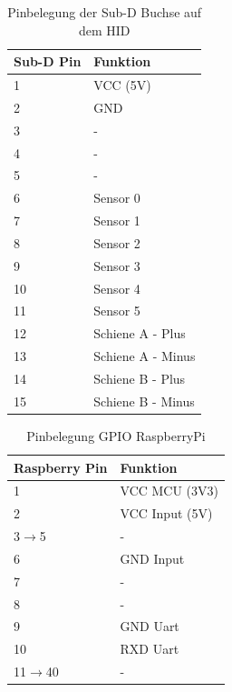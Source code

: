 \documentclass[a4paper, 11pt]{report}
\begin{document}
\begin{table}
		\begin{tabular}{|l|l|}
			\hline
			\textbf{Sub-D Pin} &\textbf{Funktion}\\
			\hline
			\hline
			1 & VCC (5V)\\
			\hline
			2 & GND\\
			\hline
			3 & -\\
			\hline
			4 & -\\
			\hline
			5 & -\\
			\hline
			6 & Sensor 0\\
			\hline
			7 & Sensor 1\\
			\hline
			8 & Sensor 2\\
			\hline
			9 & Sensor 3\\
			\hline
			10 & Sensor 4\\
			\hline
			11 & Sensor 5\\
			\hline
			12 & Schiene A - Plus\\
			\hline
			13 & Schiene A - Minus\\
			\hline
			14 & Schiene B - Plus\\
			\hline
			15 & Schiene B - Minus\\
			\hline
		\end{tabular}
		\caption{Pinbelegung der Sub-D Buchse auf dem HID}
		\label{tab:AnhangBelegungSUBD}
	\end{table}

	\begin{table}
		\begin{tabular}{|l|l|}
			\hline
			\textbf{Raspberry Pin} &\textbf{Funktion}\\
			\hline
			\hline
			1 & VCC MCU (3V3)\\
			\hline
			2 & VCC Input (5V)\\
			\hline
			3$\rightarrow$5 & -\\
			\hline
			6 & GND Input\\
			\hline
			7 & -\\
			\hline
			8 & -\\
			\hline
			9 & GND Uart\\
			\hline
			10 & RXD Uart\\
			\hline
			11$\rightarrow$40 & -\\
			\hline
		\end{tabular}
		\caption{Pinbelegung GPIO RaspberryPi}
		\label{tab:AnhangBelegungRPI}
	\end{table}
\end{document}
